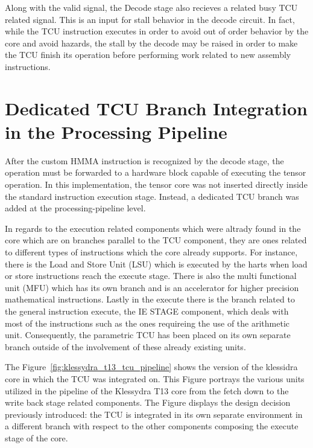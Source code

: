 Along with the valid signal, the Decode stage also recieves a related busy TCU related signal. This is an input for stall behavior in the decode circuit. In fact, while the TCU instruction executes in order to avoid out of order behavior by the core and avoid hazards, the stall by the decode may be raised in order to make the TCU finish its operation before performing work related to new assembly instructions. 

\section{Dedicated TCU Branch Integration in the Processing Pipeline}


After the custom HMMA instruction is recognized by the decode stage, the
operation must be forwarded to a hardware block capable of executing the
tensor operation. In this implementation, the tensor core was not inserted directly inside the
standard instruction execution stage. Instead, a dedicated TCU branch was added at the processing-pipeline level.


In regards to the execution related components which were altrady found in the core which are on branches parallel to the TCU component, they are ones related to different types of instructions which the core already supports. For instance, there is the Load and Store Unit (LSU) which is executed by the harts when load or store instructions reach the execute stage. There is also the multi functional unit (MFU) which has its own branch and is an accelerator for higher precision mathematical instructions. Lastly in the execute there is the branch related to the general instruction execute, the IE STAGE component, which deals with most of the instructions such as the ones requireing the use of the arithmetic unit. Consequently, the parametric TCU has been placed on its own separate branch outside of the involvement of these already existing units. 

The Figure~\ref{fig:klessydra_t13_tcu_pipeline} shows the version of the klessidra core in which the TCU was integrated on. This Figure portrays the various units utilized in the pipeline of the Klessydra T13 core from the fetch down to the write back stage related components. The Figure displays the design decision previously introduced: the TCU is integrated in its own separate environment in a different branch with respect to the other components composing the execute stage of the core.

